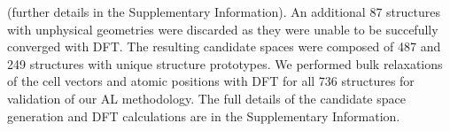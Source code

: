 (further details in the Supplementary Information).
%
An additional 87 structures with unphysical geometries were discarded as they were unable to be succefully converged with DFT.
%
%
%
The resulting candidate spaces were composed of \num{487} \IrOtwo and \num{249} \IrOthree structures with unique structure prototypes.
%
We performed bulk relaxations of the cell vectors and atomic positions with DFT for all \num{736} structures for validation of our AL methodology.
%
The full details of the candidate space generation and DFT calculations are in the Supplementary Information.
%
%

